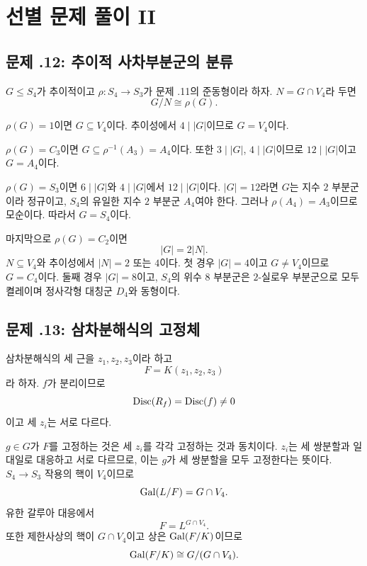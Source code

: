 \clearpage
\section{선별 문제 풀이 II}
\label{sec:quartic-quintic-solutions-b}

\subsection*{문제 \thechapter.12: 추이적 사차부분군의 분류}

\begin{solution}
$G\le S_4$가 추이적이고 $\rho:S_4\to S_3$가 문제 \thechapter.11의 준동형이라 하자. $N=G\cap V_4$라 두면
\[
  G/N\cong\rho(G).
\]

$\rho(G)=1$이면 $G\subseteq V_4$이다. 추이성에서 $4\mid|G|$이므로 $G=V_4$이다.

$\rho(G)=C_3$이면 $G\subseteq\rho^{-1}(A_3)=A_4$이다. 또한 $3\mid|G|$, $4\mid|G|$이므로 $12\mid|G|$이고 $G=A_4$이다.

$\rho(G)=S_3$이면 $6\mid|G|$와 $4\mid|G|$에서 $12\mid|G|$이다. $|G|=12$라면 $G$는 지수 $2$ 부분군이라 정규이고, $S_4$의 유일한 지수 $2$ 부분군 $A_4$여야 한다. 그러나 $\rho(A_4)=A_3$이므로 모순이다. 따라서 $G=S_4$이다.

마지막으로 $\rho(G)=C_2$이면
\[
  |G|=2|N|.
\]
$N\subseteq V_4$와 추이성에서 $|N|=2$ 또는 $4$이다. 첫 경우 $|G|=4$이고 $G\ne V_4$이므로 $G=C_4$이다. 둘째 경우 $|G|=8$이고, $S_4$의 위수 $8$ 부분군은 $2$-실로우 부분군으로 모두 켤레이며 정사각형 대칭군 $D_4$와 동형이다.
\end{solution}

\subsection*{문제 \thechapter.13: 삼차분해식의 고정체}

\begin{solution}
삼차분해식의 세 근을 $z_1,z_2,z_3$이라 하고
\[
  F=K(z_1,z_2,z_3)
\]
라 하자. $f$가 분리이므로
\[
  \operatorname{Disc}(R_f)=\operatorname{Disc}(f)\ne0
\]
이고 세 $z_i$는 서로 다르다.

$g\in G$가 $F$를 고정하는 것은 세 $z_i$를 각각 고정하는 것과 동치이다. $z_i$는 세 쌍분할과 일대일로 대응하고 서로 다르므로, 이는 $g$가 세 쌍분할을 모두 고정한다는 뜻이다. $S_4\to S_3$ 작용의 핵이 $V_4$이므로
\[
  \operatorname{Gal}(L/F)=G\cap V_4.
\]
유한 갈루아 대응에서
\[
  F=L^{G\cap V_4}.
\]
또한 제한사상의 핵이 $G\cap V_4$이고 상은 $\operatorname{Gal}(F/K)$이므로
\[
  \operatorname{Gal}(F/K)\cong G/(G\cap V_4).
\]
\end{solution}

